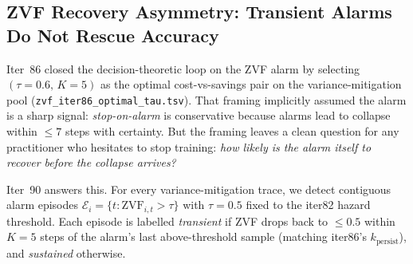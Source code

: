 
\subsection{ZVF Recovery Asymmetry: Transient Alarms Do Not Rescue Accuracy}
\label{sec:zvf-recovery}

Iter~86 closed the decision-theoretic loop on the ZVF alarm by
selecting $(\tau=0.6,\, K=5)$ as the optimal cost-vs-savings pair on
the variance-mitigation pool (\texttt{zvf\_iter86\_optimal\_tau.tsv}).
That framing implicitly assumed the alarm is a sharp signal:
\emph{stop-on-alarm} is conservative because alarms lead to collapse
within $\le 7$ steps with certainty. But the framing leaves a clean
question for any practitioner who hesitates to stop training:
\emph{how likely is the alarm itself to recover before the collapse
arrives?}

Iter~90 answers this. For every variance-mitigation trace, we
detect contiguous alarm episodes
$\mathcal{E}_i = \{t : \mathrm{ZVF}_{i,t} > \tau\}$ with
$\tau=0.5$ fixed to the iter82 hazard threshold. Each episode is
labelled \emph{transient} if ZVF drops back to $\le 0.5$ within
$K=5$ steps of the alarm's last above-threshold sample (matching
iter86's $k_{\text{persist}}$), and \emph{sustained} otherwise.

